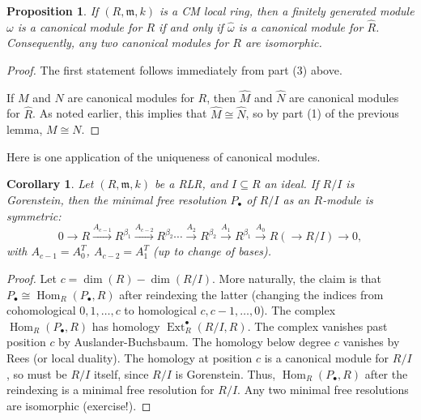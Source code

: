 \documentclass[11pt]{book}
\newtheorem{proposition}[theorem]{Proposition}
\newtheorem{corollary}[theorem]{Corollary}
\numberwithin{equation}{section}
\numberwithin{theorem}{chapter}
\theoremstyle{definition}
\newtheorem*{basic properties}{Basic Properties}
\newtheorem*{Important Remark}{Important Remark}
\theoremstyle{remark}
\newcommand{\m}{\mathfrak{m}}
\newcommand{\Hom}{\operatorname{Hom}}
\newcommand{\Ext}{\operatorname{Ext}}
\renewcommand{\dim}{\operatorname{dim}}
\begin{document}
\begin{proposition}
	If $(R,\m,k)$ is a CM local ring, then a finitely generated module $\omega$ is a canonical module for $R$ if and only if $\widehat{\omega}$ is a canonical module for $\widehat{R}$. Consequently, any two canonical modules for $R$ are isomorphic.
\end{proposition}
\begin{proof}
	The first statement follows immediately from part (3) above.
	
	If $M$ and $N$ are canonical modules for $R$, then $\widehat{M}$ and $\widehat{N}$ are canonical modules for $\widehat{R}$. As noted earlier, this implies that $\widehat{M}\cong \widehat{N}$, so by part (1) of the previous lemma, $M\cong N$.
\end{proof}

Here is one application of the uniqueness of canonical modules.

\begin{corollary} Let $(R,\m,k)$ be a RLR, and $I\subseteq R$ an ideal. If $R/I$ is Gorenstein, then the minimal free resolution $P_\bullet$ of $R/I$ as an $R$-module is symmetric:
	\[ 0\to R \stackrel{A_{c-1}}{\longrightarrow} R^{\beta_1} \stackrel{A_{c-2}}{\longrightarrow} R^{\beta_2} \cdots \stackrel{A_{2}}{\longrightarrow} R^{\beta_2} \stackrel{A_{1}}{\longrightarrow} R^{\beta_1} \stackrel{A_{0}}{\longrightarrow} R (\to R/I) \to 0,\]
	with $A_{c-1} = A_0^T$, $A_{c-2}=A_{1}^T$ (up to change of bases).
\end{corollary}
\begin{proof}
	Let $c=\dim(R)-\dim(R/I)$. More naturally, the claim is that $P_\bullet \cong \Hom_R(P_\bullet,R)$ after reindexing the latter (changing the indices from cohomological $0,1,\dots,c$ to homological $c,c-1,\dots,0$). The complex $\Hom_R(P_\bullet,R)$ has homology $\Ext^\bullet_R(R/I,R)$. The complex vanishes past position $c$ by Auslander-Buchsbaum. The homology below degree $c$ vanishes by Rees (or local duality). The homology at position $c$ is a canonical module for $R/I$, so must be $R/I$ itself, since $R/I$ is Gorenstein. Thus,  $\Hom_R(P_\bullet,R)$ after the reindexing is a minimal free resolution for $R/I$. Any two minimal free resolutions are isomorphic (exercise!).
\end{proof}
\end{document}
